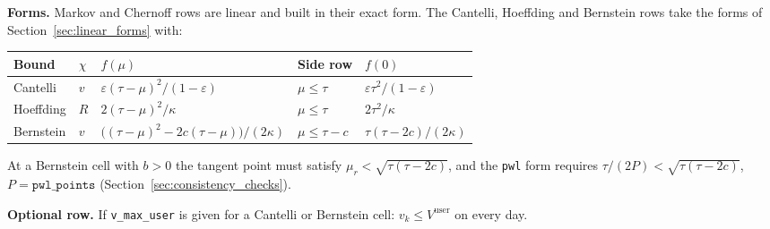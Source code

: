 \textbf{Forms.} Markov and Chernoff rows are linear and built in their exact form.
The Cantelli, Hoeffding and Bernstein rows take the forms of
Section~\ref{sec:linear_forms} with:

\begingroup\small
\begin{longtable}{@{}lllll@{}}
\toprule
Bound & $\chi$ & $f(\mu)$ & Side row & $f(0)$ \\
\midrule
Cantelli & $v$ & $\varepsilon(\tau - \mu)^2/(1 - \varepsilon)$ & $\mu \leq \tau$
  & $\varepsilon\tau^2/(1-\varepsilon)$ \\
Hoeffding & $R$ & $2(\tau - \mu)^2/\kappa$ & $\mu \leq \tau$ & $2\tau^2/\kappa$ \\
Bernstein & $v$ & $\bigl((\tau - \mu)^2 - 2c(\tau - \mu)\bigr)/(2\kappa)$
  & $\mu \leq \tau - c$ & $\tau(\tau - 2c)/(2\kappa)$ \\
\bottomrule
\end{longtable}
\endgroup

At a Bernstein cell with $b > 0$ the tangent point must satisfy
$\mu_r < \sqrt{\tau(\tau - 2c)}$, and the \texttt{pwl} form requires
$\tau/(2P) < \sqrt{\tau(\tau - 2c)}$, $P = \texttt{pwl\_points}$
(Section~\ref{sec:consistency_checks}).

\textbf{Optional row.} If \texttt{v\_max\_user} is given for a Cantelli or
Bernstein cell: $v_k \leq V^{\mathrm{user}}$ on every day.
